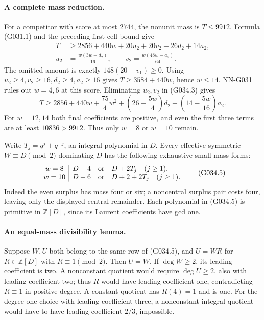 \paragraph{A complete mass reduction.}
For a competitor with score at most $2744$, the nonunit
mass is $T\le9912$. Formula (G031.1) and the preceding
first-cell bound give
\[
 \begin{aligned}
 T&\ge2856+440w+20u_2+20v_2+26d_2+14a_2,\\
 u_2&=\frac{w(3w-d_2)}{16},\qquad
 v_2=\frac{w(48w-a_2)}{64}.                         \end{aligned} \tag{G034.3}
\]
The omitted amount is exactly $148(20-v_1)\ge0$.
Using $u_2\ge4,v_2\ge16,d_2\ge4,a_2\ge16$ gives
$T\ge3584+440w$, hence $w\le14$.
NN-G031 rules out $w=4,6$ at this score.
Eliminating $u_2,v_2$ in (G034.3) gives
\[
 T\ge2856+440w+\frac{75}{4}w^2
       +\left(26-\frac{5w}{4}\right)d_2
       +\left(14-\frac{5w}{16}\right)a_2.           \tag{G034.4}
\]
For $w=12,14$ both final coefficients are positive,
and even the first three terms are at least
$10836>9912$. Thus only $w=8$ or $w=10$ remain.

Write $T_j=q^j+q^{-j}$, an integral polynomial in $D$.
Every effective symmetric $W\equiv D\pmod2$
dominating $D$ has the following exhaustive small-mass forms:
\[
 \begin{array}{c|l}
 w=8&D+4\quad\hbox{or}\quad D+2T_j\quad(j\ge1),\\
 w=10&D+6\quad\hbox{or}\quad D+2+2T_j\quad(j\ge1).
 \end{array}                                                       \tag{G034.5}
\]
Indeed the even surplus has mass four or six; a noncentral
surplus pair costs four, leaving only the displayed central
remainder. Each polynomial in (G034.5) is primitive in
$\mathbb Z[D]$, since its Laurent coefficients have gcd one.

\paragraph{An equal-mass divisibility lemma.}
Suppose $W,U$ both belong to the same row of (G034.5),
and $U=WR$ for $R\in\mathbb Z[D]$ with $R\equiv1\pmod2$.
Then $U=W$.
If $\deg W\ge2$, its leading coefficient is two.
A nonconstant quotient would require $\deg U\ge2$,
also with leading coefficient two; thus $R$ would have
leading coefficient one, contradicting $R\equiv1$
in positive degree. A constant quotient has $R(4)=1$
and is one. For the degree-one choice with leading
coefficient three, a nonconstant integral quotient would
have to have leading coefficient $2/3$, impossible.


